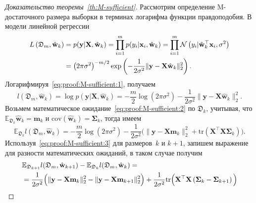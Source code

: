 \begin{proof}[Доказательство теоремы~\ref{th:M-sufficient}]
    Рассмотрим определение M-достаточного размера выборки в терминах логарифма функции правдоподобия. В модели линейной регрессии
    \begin{align}
        L\left( \mathfrak{D}_m, \hat{\mathbf{w}}_k \right) &= p(\mathbf{y} | \mathbf{X}, \hat{\mathbf{w}}_k) = \prod_{i=1}^{m} p(y_i | \mathbf{x}_i, \hat{\mathbf{w}}_k) = \prod_{i=1}^{m} \mathcal{N}\left( y_i | \hat{\mathbf{w}}_k^{\top} \mathbf{x}_i, \sigma^2 \right) \notag \\
        &= \left(2\pi\sigma^2 \right)^{-m/2} \exp\left(-\frac{1}{2\sigma^2}\|\mathbf{y} -\mathbf{X} \hat{\mathbf{w}}_k\|_2^2 \right). \label{eq:proof:M-sufficient:1}
    \end{align}
    Логарифмируя~\eqref{eq:proof:M-sufficient:1}, получаем
    \begin{equation}
        l\left( \mathfrak{D}_m, \hat{\mathbf{w}}_k \right) = \log p(\mathbf{y} | \mathbf{X}, \hat{\mathbf{w}}_k) = -\frac{m}{2}\log\left( 2\pi\sigma^2 \right) - \frac{1}{2\sigma^2} \| \mathbf{y} - \mathbf{X} \hat{\mathbf{w}}_k \|_2^2. \label{eq:proof:M-sufficient:2}
    \end{equation}
    Возьмем математическое ожидание~\eqref{eq:proof:M-sufficient:2} по $\mathfrak{D}_k$, учитывая, что $\mathbb{E}_{\mathfrak{D}_k}\hat{\mathbf{w}}_k=\mathbf{m}_k$ и $\text{cov}(\hat{\mathbf{w}}_k) = \mathbf{\Sigma}_k$, тогда имеем
    \begin{equation}
        \mathbb{E}_{\mathfrak{D}_k} l\left( \mathfrak{D}_m, \hat{\mathbf{w}}_k \right) = -\frac{m}{2}\log\left( 2\pi\sigma^2 \right) - \frac{1}{2\sigma^2} \Big( \| \mathbf{y} - \mathbf{X} \mathbf{m}_k \|_2^2 + \text{tr}\left( \mathbf{X}^{\top}\mathbf{X} \mathbf{\Sigma}_k \right) \Big). \label{eq:proof:M-sufficient:3}
    \end{equation}
    Используя~\eqref{eq:proof:M-sufficient:3} для размеров~$k$ и $k+1$, запишем выражение для разности математических ожиданий, в таком случае получим
    \begin{align}
        &\mathbb{E}_{\mathfrak{D}_{k+1}} l(\mathfrak{D}_m, \hat{\mathbf{w}}_{k+1}) - \mathbb{E}_{\mathfrak{D}_k} l(\mathfrak{D}_m, \hat{\mathbf{w}}_{k}) = \notag \\
        &= \frac{1}{2\sigma^2} \Big( \| \mathbf{y} - \mathbf{X} \mathbf{m}_k \|_2^2 - \| \mathbf{y} - \mathbf{X} \mathbf{m}_{k+1} \|_2^2 \Big) + \frac{1}{2\sigma^2} \text{tr} \Big( \mathbf{X}^{\top}\mathbf{X} \left( \mathbf{\Sigma}_k - \mathbf{\Sigma}_{k+1} \right) \Big) \notag \\

\end{align}
\end{proof}

